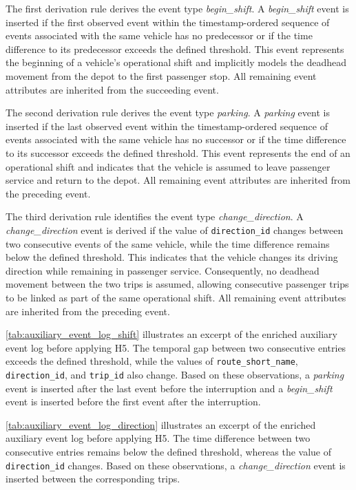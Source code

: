 The first derivation rule derives the event type \textit{begin\_shift}. A \textit{begin\_shift} event is inserted if the first observed event within the timestamp-ordered sequence of events associated with the same vehicle has no predecessor or if the time difference to its predecessor exceeds the defined threshold. This event represents the beginning of a vehicle's operational shift and implicitly models the deadhead movement from the depot to the first passenger stop. All remaining event attributes are inherited from the succeeding event.

The second derivation rule derives the event type \textit{parking}. A \textit{parking} event is inserted if the last observed event within the timestamp-ordered sequence of events associated with the same vehicle has no successor or if the time difference to its successor exceeds the defined threshold. This event represents the end of an operational shift and indicates that the vehicle is assumed to leave passenger service and return to the depot. All remaining event attributes are inherited from the preceding event.

The third derivation rule identifies the event type \textit{change\_direction}. A \textit{change\_direction} event is derived if the value of \texttt{direction\_id} changes between two consecutive events of the same vehicle, while the time difference remains below the defined threshold. This indicates that the vehicle changes its driving direction while remaining in passenger service. Consequently, no deadhead movement between the two trips is assumed, allowing consecutive passenger trips to be linked as part of the same operational shift. All remaining event attributes are inherited from the preceding event.

\autoref{tab:auxiliary_event_log_shift} illustrates an excerpt of the enriched auxiliary event log before applying H5. The temporal gap between two consecutive entries exceeds the defined threshold, while the values of \texttt{route\_short\_name}, \texttt{direction\_id}, and \texttt{trip\_id} also change. Based on these observations, a \textit{parking} event is inserted after the last event before the interruption and a \textit{begin\_shift} event is inserted before the first event after the interruption.


\autoref{tab:auxiliary_event_log_direction} illustrates an excerpt of the enriched auxiliary event log before applying H5. The time difference between two consecutive entries remains below the defined threshold, whereas the value of \texttt{direction\_id} changes. Based on these observations, a \textit{change\_direction} event is inserted between the corresponding trips.




